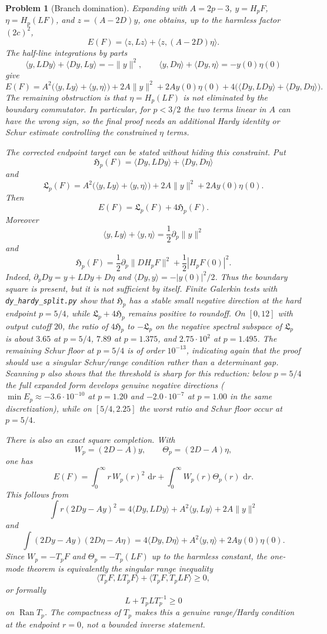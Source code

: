 \documentclass[11pt]{article}
\newtheorem{problem}[theorem]{Problem}
\newcommand{\dd}{\,\mathrm d}
\begin{document}
\begin{problem}[Branch domination]
Expanding with $A=2p-3$, $y=H_pF$, $\eta=H_p(LF)$, and
$z=(A-2D)y$, one obtains, up to the harmless factor $(2c)^2$,
\[
  E(F)=\langle z,Lz\rangle+\langle z,(A-2D)\eta\rangle .
\]
The half-line integrations by parts
\[
  \langle y,LDy\rangle+\langle Dy,Ly\rangle=-\|y\|^2,
  \qquad
  \langle y,D\eta\rangle+\langle Dy,\eta\rangle=-y(0)\eta(0)
\]
give
\[
  E(F)
  =
  A^2\bigl(\langle y,Ly\rangle+\langle y,\eta\rangle\bigr)
  +2A\|y\|^2
  +2Ay(0)\eta(0)
  +4\bigl(\langle Dy,LDy\rangle+\langle Dy,D\eta\rangle\bigr).
\]
The remaining obstruction is that $\eta=H_p(LF)$ is not eliminated by the
boundary commutator.  In particular, for $p<3/2$ the two terms linear in $A$
can have the wrong sign, so the final proof needs an additional Hardy identity
or Schur estimate controlling the constrained $\eta$ terms.

The corrected endpoint target can be stated without hiding this constraint.
Put
\[
  \mathfrak H_p(F)
   =\langle Dy,LDy\rangle+\langle Dy,D\eta\rangle
\]
and
\[
  \mathfrak L_p(F)
   =
   A^2\bigl(\langle y,Ly\rangle+\langle y,\eta\rangle\bigr)
   +2A\|y\|^2+2Ay(0)\eta(0).
\]
Then
\[
  E(F)=\mathfrak L_p(F)+4\mathfrak H_p(F).
\]
Moreover
\[
  \langle y,Ly\rangle+\langle y,\eta\rangle
  =\frac12\partial_p\|y\|^2
\]
and
\[
  \mathfrak H_p(F)
  =
  \frac12\partial_p\|D H_pF\|^2
  +\frac12|H_pF(0)|^2.
\]
Indeed,
$\partial_p Dy=y+LDy+D\eta$ and
$\langle Dy,y\rangle=-|y(0)|^2/2$.  Thus the boundary square is present, but
it is not sufficient by itself.  Finite Galerkin tests with
\texttt{dy\_hardy\_split.py} show that $\mathfrak H_p$ has a stable small
negative direction at the hard endpoint $p=5/4$, while
$\mathfrak L_p+4\mathfrak H_p$ remains positive to roundoff.  On $[0,12]$ with
output cutoff $20$, the ratio of $4\mathfrak H_p$ to $-\mathfrak L_p$ on the
negative spectral subspace of $\mathfrak L_p$ is about $3.65$ at $p=5/4$,
$7.89$ at $p=1.375$, and $2.75\cdot10^2$ at $p=1.495$.  The remaining Schur
floor at $p=5/4$ is of order $10^{-13}$, indicating again that the proof
should use a singular Schur/range condition rather than a determinant gap.
Scanning $p$ also shows that the threshold is sharp for this reduction:
below $p=5/4$ the full expanded form develops genuine negative directions
($\min E_p\approx -3.6\cdot10^{-10}$ at $p=1.20$ and
$-2.0\cdot10^{-7}$ at $p=1.00$ in the same discretization), while on
$[5/4,2.25]$ the worst ratio and Schur floor occur at $p=5/4$.

There is also an exact square completion.  With
\[
  W_p=(2D-A)y,\qquad \Theta_p=(2D-A)\eta,
\]
one has
\[
  E(F)
  =
  \int_0^\infty r\,W_p(r)^2\,\dd r
  +\int_0^\infty W_p(r)\Theta_p(r)\,\dd r .
\]
This follows from
\[
 \int r(2Dy-Ay)^2
 =4\langle Dy,LDy\rangle+A^2\langle y,Ly\rangle+2A\|y\|^2
\]
and
\[
 \int (2Dy-Ay)(2D\eta-A\eta)
 =4\langle Dy,D\eta\rangle+A^2\langle y,\eta\rangle
  +2Ay(0)\eta(0).
\]
Since $W_p=-T_pF$ and $\Theta_p=-T_p(LF)$ up to the harmless constant, the
one-mode theorem is equivalently the singular range inequality
\[
  \langle T_pF,LT_pF\rangle+\langle T_pF,T_pLF\rangle\ge0,
\]
or formally
\[
  L+T_pLT_p^{-1}\ge0
\]
on $\operatorname{Ran}T_p$.  The compactness of $T_p$ makes this a genuine
range/Hardy condition at the endpoint $r=0$, not a bounded inverse statement.


\end{problem}
\end{document}
